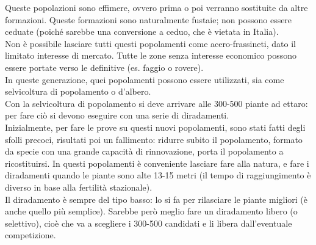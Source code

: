 Queste popolazioni sono effimere, ovvero prima o poi verranno sostituite da altre formazioni. Queste formazioni sono naturalmente fustaie; non possono essere ceduate (poiché sarebbe una conversione a ceduo, che è vietata in Italia).\\
Non è possibile lasciare tutti questi popolamenti come acero-frassineti, dato il limitato interesse di mercato. Tutte le zone senza interesse economico possono essere portate verso le definitive (es. faggio o rovere).\\
In queste generazione, quei popolamenti possono essere utilizzati, sia come selvicoltura di popolamento o d'albero.\\
Con la selvicoltura di popolamento si deve arrivare alle 300-500 piante ad ettaro: per fare ciò si devono eseguire con una serie di diradamenti.\\
Inizialmente, per fare le prove su questi nuovi popolamenti, sono stati fatti degli sfolli precoci, risultati poi un fallimento: ridurre subito il popolamento, formato da specie con una grande capacità di rinnovazione, porta il popolamento a ricostituirsi. In questi popolamenti è conveniente lasciare fare alla natura, e fare i diradamenti quando le piante sono alte 13-15 metri (il tempo di raggiungimento è diverso in base alla fertilità stazionale).\\
Il diradamento è sempre del tipo basso: lo si fa per rilasciare le piante migliori (è anche quello più semplice). Sarebbe però meglio fare un diradamento libero (o selettivo), cioè che va a scegliere i 300-500 candidati e li libera dall'eventuale competizione.\\
\\
